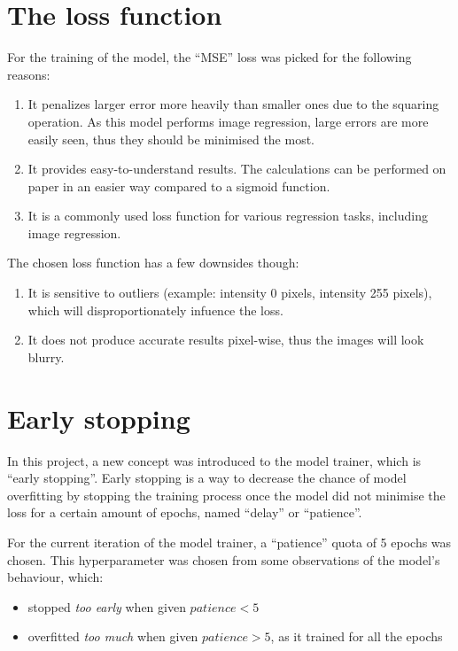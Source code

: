 \documentclass[conference]{IEEEtran}
\begin{document}
\section{The loss function}
For the training of the model, the ``MSE'' loss was picked for the following reasons:

\begin{enumerate}
    \item It penalizes larger error more heavily than smaller ones due to the squaring operation. As this model performs
    image regression, large errors are more easily seen, thus they should be minimised the most.
    \item It provides easy-to-understand results. The calculations can be performed on paper in an easier way compared to
    a sigmoid function.
    \item It is a commonly used loss function for various regression tasks, including image regression.
\end{enumerate}

The chosen loss function has a few downsides though:

\begin{enumerate}
    \item It is sensitive to outliers (example: intensity 0 pixels, intensity 255 pixels), which will disproportionately
    infuence the loss.
    \item It does not produce accurate results pixel-wise, thus the images will look blurry.
\end{enumerate}

\section{Early stopping}
In this project, a new concept was introduced to the model trainer, which is ``early stopping''. Early stopping is a way to
decrease the chance of model overfitting by stopping the training process once the model did not minimise the loss for a
certain amount of epochs, named ``delay'' or ``patience''.

For the current iteration of the model trainer, a ``patience'' quota of 5 epochs was chosen. This hyperparameter was chosen
from some observations of the model's behaviour, which:

\begin{itemize}
    \item stopped \textit{too early} when given $patience < 5$
    \item overfitted \textit{too much} when given $patience > 5$, as it trained for all the epochs
\end{itemize}
\end{document}

